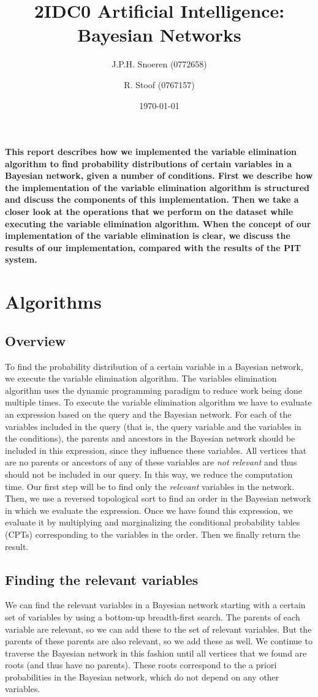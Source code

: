 \documentclass[10pt,a4paper]{article}
\author{J.P.H. Snoeren (0772658) \and R. Stoof (0767157)}
\date{\today}
\title{2IDC0 Artificial Intelligence: Bayesian Networks}
\begin{document}
\maketitle
\textbf{This report describes how we implemented the variable elimination algorithm to find probability distributions of certain variables in a Bayesian network, given a number of conditions. First we describe how the implementation of the variable elimination algorithm is structured and discuss the components of this implementation. Then we take a closer look at the operations that we perform on the dataset while executing the variable elimination algorithm. When the concept of our implementation of the variable elimination is clear, we discuss the results of our implementation, compared with the results of the PIT system.} 

\section{Algorithms}
\subsection{Overview}
To find the probability distribution of a certain variable in a Bayesian network, we execute the variable elimination algorithm. The variables elimination algorithm uses the dynamic programming paradigm to reduce work being done multiple times. To execute the variable elimination algorithm we have to evaluate an expression based on the query and the Bayesian network. For each of the variables included in the query (that is, the query variable and the variables in the conditions), the parents and ancestors in the Bayesian network should be included in this expression, since they influence these variables. All vertices that are no parents or ancestors of any of these variables are \emph{not relevant} and thus should not be included in our query. In this way, we reduce the computation time. Our first step will be to find only the \emph{relevant} variables in the network. Then, we use a reversed topological sort to find an order in the Bayesian network in which we evaluate the expression. Once we have found this expression, we evaluate it by multiplying and marginalizing the conditional probability tables (CPTs) corresponding to the variables in the order. Then we finally return the result.
\subsection{Finding the relevant variables}
We can find the relevant variables in a Bayesian network starting with a certain set of variables by using a bottom-up breadth-first search. The parents of each variable are relevant, so we can add these to the set of relevant variables. But the parents of these parents are also relevant, so we add these as well. We continue to traverse the Bayesian network in this fashion until all vertices that we found are roots (and thus have no parents). These roots correspond to the a priori probabilities in the Bayesian network, which do not depend on any other variables. 
\end{document}
